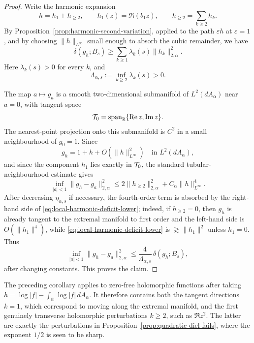 \documentclass[a4paper,10pt]{amsart}
\newcommand{\D}{\mathbb{D}}
\begin{document}
\begin{proof}
Write the harmonic expansion
\[
h=h_1+h_{\ge2},
\qquad
h_1(z)=\Re(b_1z),\qquad
h_{\ge2}=\sum_{k\ge2}h_k.
\]
By Proposition~\ref{prop:harmonic-second-variation}, applied to the path
$\varepsilon h$ at $\varepsilon=1$, and by choosing $\|h\|_{L^\infty}$ small
enough to absorb the cubic remainder, we have
\begin{equation}\label{eq:local-harmonic-deficit-lower}
\delta(g_h;B_s)
\ge
\sum_{k\ge1}\lambda_k(s)\|h_k\|_{2,\alpha}^2.
\end{equation}
Here $\lambda_k(s)>0$ for every $k$, and
\[
\Lambda_{\alpha,s}:=\inf_{k\ge2}\lambda_k(s)>0.
\]

The map $a\mapsto g_a$ is a smooth two-dimensional submanifold of
$L^2(dA_\alpha)$ near $a=0$, with tangent space
\[
\mathcal{T}_0=\operatorname{span}_{\mathbb R}\{\operatorname{Re} z,\operatorname{Im} z\}.
\]
The nearest-point projection onto this submanifold is $C^2$ in a small
neighbourhood of $g_0=1$. Since
\[
g_h
=1+h+O(\|h\|_{L^\infty}^2)
\quad\text{in }L^2(dA_\alpha),
\]
and since the component $h_1$ lies exactly in $\mathcal{T}_0$, the standard
tubular-neighbourhood estimate gives
\begin{equation}\label{eq:local-harmonic-distance-upper}
\inf_{|a|<1}\|g_h-g_a\|_{2,\alpha}^2
\le
2\|h_{\ge2}\|_{2,\alpha}^2
+C_\alpha\|h\|_{L^\infty}^4.
\end{equation}
After decreasing $\eta_{\alpha,s}$ if necessary, the fourth-order term is
absorbed by the right-hand side of
\eqref{eq:local-harmonic-deficit-lower}; indeed, if $h_{\ge2}=0$, then
$g_h$ is already tangent to the extremal manifold to first order and the
left-hand side is $O(\|h_1\|^4)$, while
\eqref{eq:local-harmonic-deficit-lower} is $\gtrsim\|h_1\|^2$ unless
$h_1=0$. Thus
\[
\inf_{|a|<1}\|g_h-g_a\|_{2,\alpha}^2
\le
\frac{4}{\Lambda_{\alpha,s}}\,
\delta(g_h;B_s),
\]
after changing constants. This proves the claim.
\end{proof}

\begin{numrem}
The preceding corollary applies to zero-free holomorphic functions after taking
$h=\log|f|-\int_\D\log|f|\,dA_\alpha$. It therefore contains both the tangent
directions $k=1$, which correspond to moving along the extremal manifold, and
the first genuinely transverse holomorphic perturbations $k\ge2$, such as
$\Re z^2$. The latter are exactly the perturbations in
Proposition~\ref{prop:quadratic-diel-fails}, where the exponent $1/2$ is seen
to be sharp.
\end{numrem}
\end{document}
